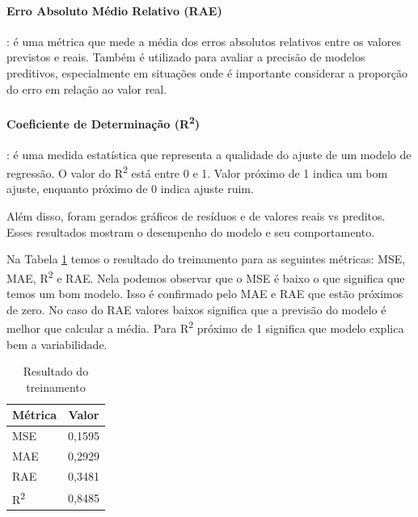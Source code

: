 \documentclass[12pt,a4paper,oneside]{report}
\begin{document}
	\paragraph{Erro Absoluto Médio Relativo (RAE)}: é uma métrica que mede a média dos erros absolutos relativos entre os valores previstos e reais. Também é utilizado para avaliar a precisão de modelos preditivos, especialmente em situações onde é importante considerar a proporção do erro em relação ao valor real. 
	
	\paragraph{Coeficiente de Determinação (R\textsuperscript{2})}: é uma medida estatística que representa a qualidade do ajuste de um modelo de regressão. O valor do R\textsuperscript{2} está entre 0 e 1. Valor próximo de 1 indica um bom ajuste, enquanto próximo de 0 indica ajuste ruim.\cite{geeksforgeeks:2024}
	
	Além disso, foram gerados gráficos de resíduos e de valores reais vs preditos. Esses resultados mostram o desempenho do modelo e seu comportamento.
	
	Na Tabela \ref{tab:results_train} temos o resultado do treinamento para as seguintes métricas: MSE, MAE, R\textsuperscript{2} e RAE. Nela podemos observar que o MSE é baixo o que significa que temos um bom modelo. Isso é confirmado pelo MAE e RAE que estão próximos de zero. No caso do RAE valores baixos significa que a previsão do modelo é melhor que calcular a média. Para R\textsuperscript{2} próximo de 1 significa que modelo explica bem a variabilidade.
	\begin{table}[H]
		\centering
		\caption{Resultado do treinamento}
		\label{tab:results_train}
		\begin{tabular}{l c}
			\toprule
			\textbf{Métrica} & \textbf{Valor} \\
			\midrule
			MSE         & 0,1595 \\
			MAE         & 0,2929 \\
			RAE			& 0,3481\\
			R\textsuperscript{2}          & 0,8485 \\
			\bottomrule
		\end{tabular}
	\end{table}
\end{document}
